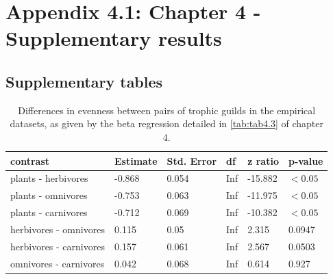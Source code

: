 \chapter[Appendix 4.1: Chapter 4 - Supplementary results]{Appendix 4.1: Chapter 4 - Supplementary results}\label{ch:SAD_appendix}
\renewcommand{\thefigure}{A.4.1.\arabic{figure}}
\setcounter{figure}{0}

\renewcommand{\thetable}{A.4.1.\arabic{table}}
\setcounter{table}{0}

\section*{Supplementary tables}

\begin{table}[ht!]
\centering
\caption[Guild pairs differences in evenness]{\color{Gray}Differences in evenness between pairs of trophic guilds in the empirical datasets, as given by the beta regression detailed in \cref{tab:tab4.3} of chapter 4.}\label{tab:tabApp4.1.4}
\begin{tabular}{llllll}
\hline
contrast  &                       Estimate       & Std. Error & df & z ratio & p-value \\
\hline
plants - herbivores    & -0.868 & 0.054 & Inf & -15.882 &  $<0.05$ \\
plants - omnivores    &  -0.753 & 0.063 & Inf & -11.975 & $<0.05$ \\
plants - carnivores   &  -0.712 & 0.069 & Inf & -10.382 & $<0.05$ \\
herbivores - omnivores &  0.115 & 0.05 & Inf &  2.315 & 0.0947 \\
herbivores - carnivores & 0.157 & 0.061 & Inf &  2.567 &  0.0503 \\
omnivores - carnivores  & 0.042 & 0.068 & Inf &  0.614 & 0.927 \\
\hline
\end{tabular}

\end{table}

